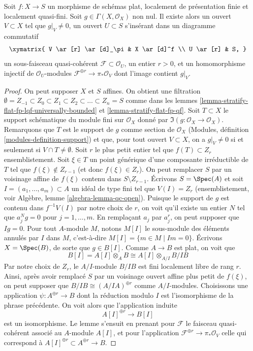 \begin{lemma}
\label{lemma-go-down-with-annihilators}
Soit $f : X \to S$ un morphisme de schémas plat, localement de
présentation finie et localement quasi-fini. Soit
$g \in \Gamma(X, \mathcal{O}_X)$ non nul. Il existe alors
un ouvert $V \subset X$ tel que $g|_V \not = 0$, un ouvert
$U \subset S$ s'insérant dans un diagramme commutatif
$$
\xymatrix{
V \ar[r] \ar[d]_\pi & X \ar[d]^f \\
U \ar[r] & S,
}
$$
un sous-faisceau quasi-cohérent $\mathcal{F} \subset \mathcal{O}_U$, un entier
$r > 0$, et un homomorphisme injectif de $\mathcal{O}_U$-modules
$\mathcal{F}^{\oplus r} \to \pi_*\mathcal{O}_V$
dont l'image contient $g|_V$.
\end{lemma}

\begin{proof}
On peut supposer $X$ et $S$ affines. On obtient une filtration
$\emptyset = Z_{-1} \subset Z_0 \subset Z_1 \subset Z_2 \subset \ldots
\subset Z_n = S$ comme dans les
lemmes \ref{lemma-stratify-flat-fp-lqf-universally-bounded} et
\ref{lemma-stratify-flat-fp-qf}.
Soit $T \subset X$ le support schématique du module fini
sur $\mathcal{O}_X$ donné par $\Im(g : \mathcal{O}_X \to \mathcal{O}_X)$.
Remarquons que $T$ est le support de $g$ comme section de $\mathcal{O}_X$
(Modules, définition \ref{modules-definition-support}) et que,
pour tout ouvert $V \subset X$, on a $g|_V \not = 0$ si et seulement si
$V \cap T \not = \emptyset$.
Soit $r$ le plus petit entier tel que $f(T) \subset Z_r$
ensemblistement. Soit $\xi \in T$ un point générique d'une composante irréductible
de $T$ tel que $f(\xi) \not \in Z_{r - 1}$ (et donc
$f(\xi) \in Z_r$). On peut remplacer $S$ par un voisinage affine de
$f(\xi)$ contenu dans $S \setminus Z_{r - 1}$. Écrivons $S = \Spec(A)$
et soit $I = (a_1, \ldots, a_m) \subset A$ un idéal de type fini
tel que $V(I) = Z_r$ (ensemblistement, voir
Algèbre, lemme \ref{algebra-lemma-qc-open}).
Puisque le support de $g$ est contenu dans $f^{-1}V(I)$ par notre choix de $r$,
on voit qu'il existe un entier $N$ tel que
$a_j^N g = 0$ pour $j = 1, \ldots, m$. En remplaçant $a_j$ par $a_j^r$,
on peut supposer que $Ig = 0$. Pour tout $A$-module $M$, notons
$M[I]$ le sous-module des éléments annulés par $I$ dans $M$, c'est-à-dire $M[I] = \{m \in M \mid Im = 0\}$.
Écrivons $X = \Spec(B)$, de sorte que $g \in B[I]$. Comme $A \to B$ est plat, on
voit que
$$
B[I] = A[I] \otimes_A B \cong A[I] \otimes_{A/I} B/IB
$$
Par notre choix de $Z_r$, le $A/I$-module $B/IB$ est
fini localement libre de rang $r$. Ainsi, après avoir remplacé $S$ par
un voisinage ouvert affine plus petit de $f(\xi)$, on peut supposer
que $B/IB \cong (A/IA)^{\oplus r}$ comme $A/I$-modules.
Choisissons une application $\psi : A^{\oplus r} \to B$ dont la réduction modulo $I$ est
l'isomorphisme de la phrase précédente. On voit alors que
l'application induite
$$
A[I]^{\oplus r} \longrightarrow B[I]
$$
est un isomorphisme. Le lemme s'ensuit en prenant pour $\mathcal{F}$ le
faisceau quasi-cohérent associé au $A$-module $A[I]$, et pour
l'application $\mathcal{F}^{\oplus r} \to \pi_*\mathcal{O}_V$ celle
qui correspond à $A[I]^{\oplus r} \subset A^{\oplus r} \to B$.
\end{proof}

